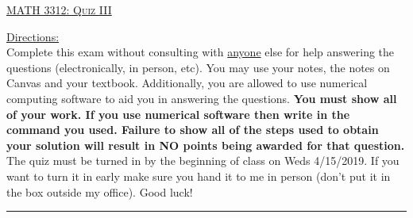 \documentclass[10pt, a4paper]{article}
\theoremstyle{break}
\begin{document}
\begin{center}
{\large \textsc{\underline{MATH 3312: Quiz III}}}
\vspace{0.125in}
\end{center}
\underline{Directions:} \\
Complete this exam without consulting with \underline{anyone} else for help answering the questions (electronically, in person, etc). You may use your notes, the notes on Canvas and your textbook. Additionally, you are allowed to use numerical computing software to aid you in answering the questions. \textbf{You must show all of your work. If you use numerical software then write in the command you used. Failure to show all of the steps used to obtain your solution will result in NO points being awarded for that question. } 
\noindent The quiz must be turned in by the beginning of class on Weds 4/15/2019. If you want to turn it in early make sure you hand it to me in person (don't put it in the box outside my office). Good luck! \\
\noindent\rule{15cm}{0.4pt}

\vspace{0.25in}
\end{document}
